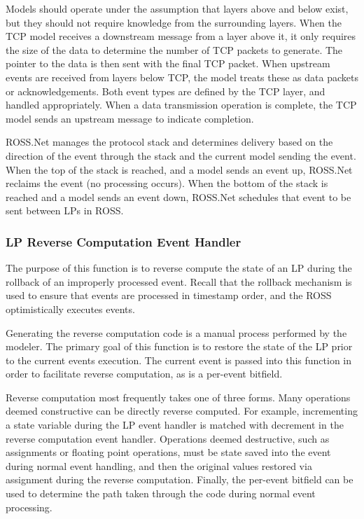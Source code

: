 \documentclass[conference,onecolumn]{IEEEtran}
\begin{document}
Models should operate under the assumption that layers above and below exist, but they should not require knowledge from the surrounding layers.  When the TCP model receives a downstream message from a layer above it, it only requires the size of the data to determine the number of TCP packets to generate.  The pointer to the data is then sent with the final TCP packet.  When upstream events are received from layers below TCP, the model treats these as data packets or acknowledgements.   Both event types are defined by the TCP layer, and handled appropriately.  When a data transmission operation is complete, the TCP model sends an upstream message to indicate completion.

ROSS.Net manages the protocol stack and determines delivery based on the direction of the event through the stack and the current model sending the event.  When the top of the stack is reached, and a model sends an event up, ROSS.Net reclaims the event (no processing occurs).  When the bottom of the stack is reached and a model sends an event down, ROSS.Net schedules that event to be sent between LPs in ROSS.

\subsubsection{LP Reverse Computation Event Handler}

The purpose of this function is to reverse compute the state of an LP during the rollback of an improperly processed event.  Recall that the rollback mechanism is used to ensure that events are processed in timestamp order, and the ROSS optimistically executes events.

Generating the reverse computation code is a manual process performed by the modeler.  The primary goal of this function is to restore the state of the LP prior to the current events execution.  The current event is passed into this function in order to facilitate reverse computation, as is a per-event bitfield.

Reverse computation most frequently takes one of three forms.  Many operations deemed constructive can be directly reverse computed.  For example, incrementing a state variable during the LP event handler is matched with decrement in the reverse computation event handler.  Operations deemed destructive, such as assignments or floating point operations, must be state saved into the event during normal event handling, and then the original values restored via assignment during the reverse computation.  Finally, the per-event bitfield can be used to determine the path taken through the code during normal event processing.
\end{document}
